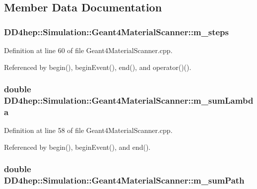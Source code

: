 \subsection{Member Data Documentation}
\hypertarget{class_d_d4hep_1_1_simulation_1_1_geant4_material_scanner_aa8e97ed5d8812c6b4b4ceb0dce5f37d8}{
\subsubsection[{m\_\-steps}]{ {\bf DD4hep::Simulation::Geant4MaterialScanner::m\_\-steps}}}
\label{class_d_d4hep_1_1_simulation_1_1_geant4_material_scanner_aa8e97ed5d8812c6b4b4ceb0dce5f37d8}


Definition at line 60 of file Geant4MaterialScanner.cpp.

Referenced by begin(), beginEvent(), end(), and operator()().\hypertarget{class_d_d4hep_1_1_simulation_1_1_geant4_material_scanner_a0632ba964c16dfa195aef83134e51430}{
\subsubsection[{m\_\-sumLambda}]{\setlength{\rightskip}{0pt plus 5cm}double {\bf DD4hep::Simulation::Geant4MaterialScanner::m\_\-sumLambda}}}
\label{class_d_d4hep_1_1_simulation_1_1_geant4_material_scanner_a0632ba964c16dfa195aef83134e51430}


Definition at line 58 of file Geant4MaterialScanner.cpp.

Referenced by begin(), beginEvent(), and end().\hypertarget{class_d_d4hep_1_1_simulation_1_1_geant4_material_scanner_a2e04ec21c3f2d1800037e2dd427c8dc7}{
\subsubsection[{m\_\-sumPath}]{\setlength{\rightskip}{0pt plus 5cm}double {\bf DD4hep::Simulation::Geant4MaterialScanner::m\_\-sumPath}}}
\label{class_d_d4hep_1_1_simulation_1_1_geant4_material_scanner_a2e04ec21c3f2d1800037e2dd427c8dc7}



